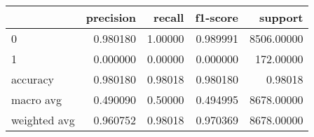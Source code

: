 \begin{tabular}{lrrrr}
\toprule
{} &  precision &   recall &  f1-score &     support \\
\midrule
0            &   0.980180 &  1.00000 &  0.989991 &  8506.00000 \\
1            &   0.000000 &  0.00000 &  0.000000 &   172.00000 \\
accuracy     &   0.980180 &  0.98018 &  0.980180 &     0.98018 \\
macro avg    &   0.490090 &  0.50000 &  0.494995 &  8678.00000 \\
weighted avg &   0.960752 &  0.98018 &  0.970369 &  8678.00000 \\
\bottomrule
\end{tabular}
